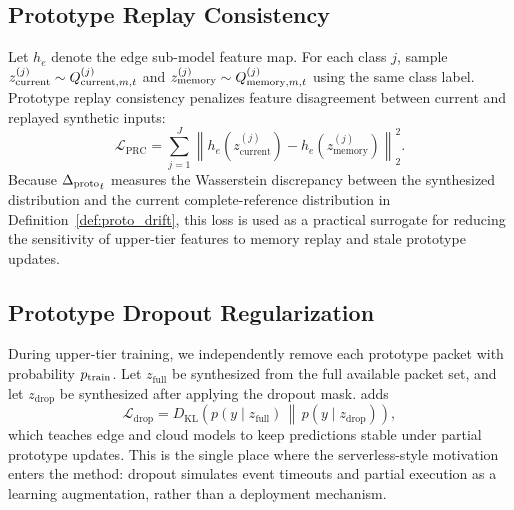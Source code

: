 \subsection{Prototype Replay Consistency}
Let $h_e$ denote the edge sub-model feature map. For each class $j$, sample $z_{\mathrm{current}}^{(j)}\sim Q_{\mathrm{current},m,t}^{(j)}$ and $z_{\mathrm{memory}}^{(j)}\sim Q_{\mathrm{memory},m,t}^{(j)}$ using the same class label. Prototype replay consistency penalizes feature disagreement between current and replayed synthetic inputs:
\begin{equation}
    \mathcal{L}_{\mathrm{PRC}}
    =
    \sum_{j=1}^{J}
    \left\|
    h_e\!\left(z_{\mathrm{current}}^{(j)}\right)
    -
    h_e\!\left(z_{\mathrm{memory}}^{(j)}\right)
    \right\|_2^2 .
    \label{eq:prc_loss}
\end{equation}
Because ${\Delta_{\mathrm{proto}}}_t$ measures the Wasserstein discrepancy between the synthesized distribution and the current complete-reference distribution in Definition~\ref{def:proto_drift}, this loss is used as a practical surrogate for reducing the sensitivity of upper-tier features to memory replay and stale prototype updates.

\subsection{Prototype Dropout Regularization}
During upper-tier training, we independently remove each prototype packet with probability $p_{\mathrm{train}}$. Let $z_{\mathrm{full}}$ be synthesized from the full available packet set, and let $z_{\mathrm{drop}}$ be synthesized after applying the dropout mask. \ehsfp adds
\begin{equation}
    \mathcal{L}_{\mathrm{drop}}
    =
    D_{\mathrm{KL}}\!\left(
    p(y\mid z_{\mathrm{full}})
    \,\middle\|\,
    p(y\mid z_{\mathrm{drop}})
    \right),
    \label{eq:drop_loss}
\end{equation}
which teaches edge and cloud models to keep predictions stable under partial prototype updates. This is the single place where the serverless-style motivation enters the method: dropout simulates event timeouts and partial execution as a learning augmentation, rather than a deployment mechanism.

